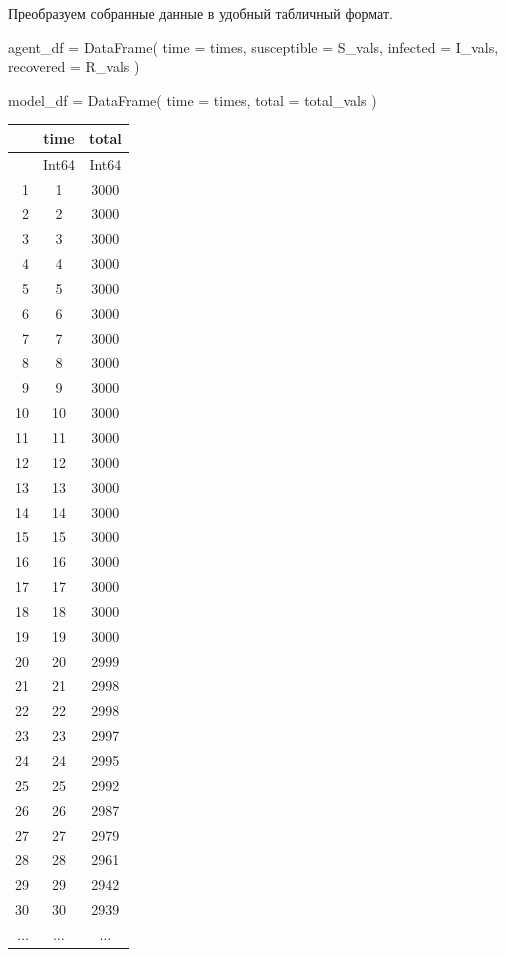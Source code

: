 \documentclass[
  12pt,
  a4paper,
  DIV=11,
  numbers=noendperiod]{scrreprt}
\newenvironment{Shaded}{\begin{snugshade}}{\end{snugshade}}
\newcommand{\FunctionTok}[1]{\textcolor[rgb]{0.28,0.35,0.67}{#1}}
\newcommand{\NormalTok}[1]{\textcolor[rgb]{0.00,0.23,0.31}{#1}}
\newcommand{\OperatorTok}[1]{\textcolor[rgb]{0.37,0.37,0.37}{#1}}
\begin{document}
Преобразуем собранные данные в удобный табличный формат.

\begin{Shaded}
\begin{Highlighting}[]
\NormalTok{agent\_df }\OperatorTok{=} \FunctionTok{DataFrame}\NormalTok{(}
\NormalTok{    time }\OperatorTok{=}\NormalTok{ times,}
\NormalTok{    susceptible }\OperatorTok{=}\NormalTok{ S\_vals,}
\NormalTok{    infected }\OperatorTok{=}\NormalTok{ I\_vals,}
\NormalTok{    recovered }\OperatorTok{=}\NormalTok{ R\_vals}
\NormalTok{)}

\NormalTok{model\_df }\OperatorTok{=} \FunctionTok{DataFrame}\NormalTok{(}
\NormalTok{    time }\OperatorTok{=}\NormalTok{ times,}
\NormalTok{    total }\OperatorTok{=}\NormalTok{ total\_vals}
\NormalTok{)}
\end{Highlighting}
\end{Shaded}

\begin{tabular}{r|cc}
    & time & total\\
    \hline
    & Int64 & Int64\\
    \hline
    1 & 1 & 3000 \\
    2 & 2 & 3000 \\
    3 & 3 & 3000 \\
    4 & 4 & 3000 \\
    5 & 5 & 3000 \\
    6 & 6 & 3000 \\
    7 & 7 & 3000 \\
    8 & 8 & 3000 \\
    9 & 9 & 3000 \\
    10 & 10 & 3000 \\
    11 & 11 & 3000 \\
    12 & 12 & 3000 \\
    13 & 13 & 3000 \\
    14 & 14 & 3000 \\
    15 & 15 & 3000 \\
    16 & 16 & 3000 \\
    17 & 17 & 3000 \\
    18 & 18 & 3000 \\
    19 & 19 & 3000 \\
    20 & 20 & 2999 \\
    21 & 21 & 2998 \\
    22 & 22 & 2998 \\
    23 & 23 & 2997 \\
    24 & 24 & 2995 \\
    25 & 25 & 2992 \\
    26 & 26 & 2987 \\
    27 & 27 & 2979 \\
    28 & 28 & 2961 \\
    29 & 29 & 2942 \\
    30 & 30 & 2939 \\
    $\dots$ & $\dots$ & $\dots$ \\
\end{tabular}
\end{document}

